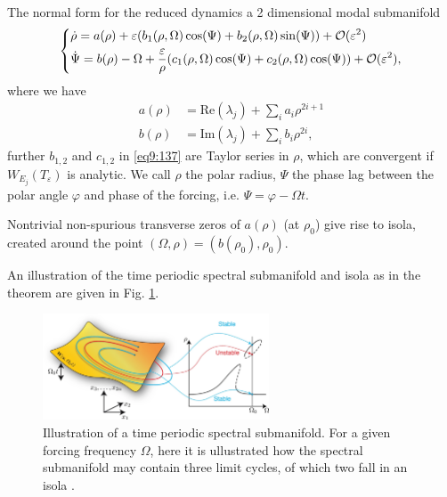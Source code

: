 The normal form for the reduced dynamics a 2 dimensional modal submanifold
\begin{align}
	\begin{dcases}
	\dot{\rho} = a(\rho) + \varepsilon (b_1(\rho, \Omega) \cos(\Psi) + b_2(\rho, \Omega)\sin(\Psi)) + \mathcal{O}(\varepsilon^2)\\
	\dot{\Psi} = b(\rho) - \Omega + \frac{\varepsilon}{\rho}(c_1(\rho, \Omega) \cos(\Psi) + c_2(\rho, \Omega)\cos(\Psi))+ \mathcal{O}(\varepsilon^2), 
\end{dcases} \label{eq9:137}
\end{align}
where we have
\begin{align}
	a(\rho) &=  \textrm{Re} (\lambda_j) + \sum_{i}^{} a_i \rho^{2i+1} \\
	b(\rho) &=  \textrm{Im} (\lambda_j) + \sum_{i}^{} b_i \rho^{2i},
\end{align}
further $b_{1,2}$ and $c_{1,2}$ in \eqref{eq9:137} are Taylor series in $\rho$, which are convergent if $W_{E_j}(T_\varepsilon)$ is analytic. We call $\rho $ the polar radius, $\Psi $ the phase lag between the polar angle $\varphi $ and phase of the forcing, i.e. $\Psi = \varphi-\Omega t$. 
\begin{theorem}[]
	Nontrivial non-spurious transverse zeros of $a(\rho)$ (at $\rho_0$) give rise to isola, created around the point $(\Omega, \rho) = (b(\rho_0), \rho_0)$.
\end{theorem}
An illustration of the time periodic spectral submanifold and isola as in the theorem are given in Fig. \ref{fig:time_periodic_ssm}.
\begin{figure}[h!]
	\centering
	\includegraphics[width=0.6\textwidth]{figures/ch9/time_periodic_ssm.pdf}
	\caption{Illustration of a time periodic spectral submanifold. For a given forcing frequency $\Omega  $, here it is ullustrated how the spectral submanifold may contain three limit cycles, of which two fall in an isola \cite{Ponsioen2020}.}
	\label{fig:time_periodic_ssm}
\end{figure}


